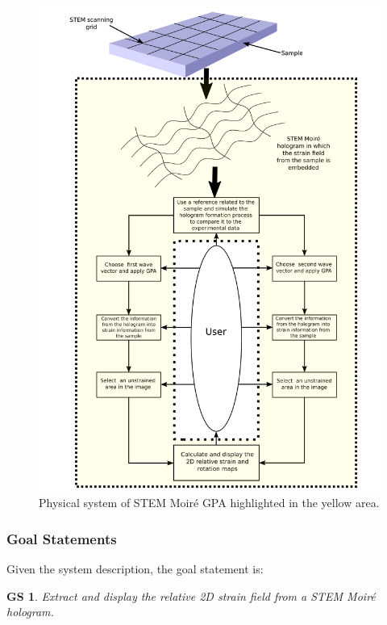 \documentclass[12pt]{article}
\newcommand{\progname}{STEM Moir{\'e} GPA}
\newtheorem{GS}{GS}
\begin{document}
\begin{figure}[H]
\begin{center}
\includegraphics[scale=0.65]{Figures/System_description.png}
\caption{Physical system of \progname{} highlighted in the yellow area.}
\label{fig:system_description}
\end{center}
\end{figure}


\subsubsection{Goal Statements}
\noindent Given the system description, the goal statement is:
\begin{GS}
\normalfont Extract and display the relative 2D strain field from a STEM Moir{\'e} hologram.
\label{GS_1}
\end{GS}
\end{document}
